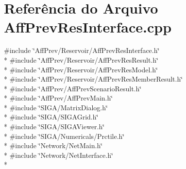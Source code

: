 \section{Referência do Arquivo Aff\+Prev\+Res\+Interface.\+cpp}
\label{_aff_prev_res_interface_8cpp}
{\ttfamily \#include \char`\"{}Aff\+Prev/\+Reservoir/\+Aff\+Prev\+Res\+Interface.\+h\char`\"{}}\\*
{\ttfamily \#include \char`\"{}Aff\+Prev/\+Reservoir/\+Aff\+Prev\+Res\+Result.\+h\char`\"{}}\\*
{\ttfamily \#include \char`\"{}Aff\+Prev/\+Reservoir/\+Aff\+Prev\+Res\+Model.\+h\char`\"{}}\\*
{\ttfamily \#include \char`\"{}Aff\+Prev/\+Reservoir/\+Aff\+Prev\+Res\+Member\+Result.\+h\char`\"{}}\\*
{\ttfamily \#include \char`\"{}Aff\+Prev/\+Aff\+Prev\+Scenario\+Result.\+h\char`\"{}}\\*
{\ttfamily \#include \char`\"{}Aff\+Prev/\+Aff\+Prev\+Main.\+h\char`\"{}}\\*
{\ttfamily \#include \char`\"{}S\+I\+G\+A/\+Matrix\+Dialog.\+h\char`\"{}}\\*
{\ttfamily \#include \char`\"{}S\+I\+G\+A/\+S\+I\+G\+A\+Grid.\+h\char`\"{}}\\*
{\ttfamily \#include \char`\"{}S\+I\+G\+A/\+S\+I\+G\+A\+Viewer.\+h\char`\"{}}\\*
{\ttfamily \#include \char`\"{}S\+I\+G\+A/\+Numericals/\+Prctile.\+h\char`\"{}}\\*
{\ttfamily \#include \char`\"{}Network/\+Net\+Main.\+h\char`\"{}}\\*
{\ttfamily \#include \char`\"{}Network/\+Net\+Interface.\+h\char`\"{}}\\*
